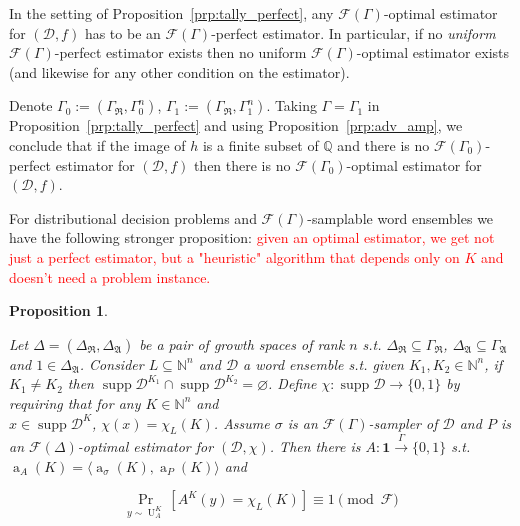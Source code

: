 \documentclass[11pt]{article}
\numberwithin{equation}{section}
\theoremstyle{definition}
\theoremstyle{plain}
\newtheorem{proposition}{Proposition}[section]
\newcommand{\Bool}{\{0,1\}}
\DeclareMathOperator{\Supp}{supp}
\DeclareMathOperator{\Prb}{Pr}
\DeclareMathOperator{\A}{a}
\DeclareMathOperator{\Un}{U}
\newcommand{\Nats}{\mathbb{N}}
\newcommand{\Rats}{\mathbb{Q}}
\newcommand{\Chev}[1]{\langle #1 \rangle}
\newcommand{\Dist}{\mathcal{D}}
\newcommand{\GrowR}{\Gamma_{\mathfrak{R}}}
\newcommand{\GrowA}{\Gamma_{\mathfrak{A}}}
\newcommand{\Fall}{\mathcal{F}}
\newcommand{\EG}{\Fall(\Gamma)}
\newcommand{\Scheme}{\xrightarrow{\Gamma}}
\begin{document}
In the setting of Proposition~\ref{prp:tally_perfect}, any ${\EG}$-optimal estimator for ${(\Dist,f)}$ has to be an ${\EG}$-perfect estimator. In particular, if no \emph{uniform} ${\EG}$-perfect estimator exists then no uniform ${\EG}$-optimal estimator exists (and likewise for any other condition on the estimator). 

Denote ${\Gamma_0:=(\GrowR,\Gamma_0^n)}$, ${\Gamma_1:=(\GrowR,\Gamma_1^n)}$. Taking ${\Gamma=\Gamma_1}$ in Proposition~\ref{prp:tally_perfect} and using Proposition~\ref{prp:adv_amp}, we conclude that if the image of ${h}$ is a finite subset of ${\Rats}$ and there is no ${\Fall(\Gamma_0)}$-perfect estimator for ${(\Dist,f)}$ then there is no ${\Fall(\Gamma_0)}$-optimal estimator for ${(\Dist,f)}$. 

For distributional decision problems and ${\EG}$-samplable word ensembles we have the following stronger proposition: \textcolor{red}{given an optimal estimator, we get not just a perfect estimator, but a "heuristic" algorithm that depends only on $K$ and doesn't need a problem instance.}

\begin{samepage}
\begin{proposition}
\label{prp:tally_smp_bpp}

Let ${\Delta=(\Delta_{\mathfrak{R}}, \Delta_{\mathfrak{A}})}$ be a pair of growth spaces of rank ${n}$ s.t. ${\Delta_{\mathfrak{R}} \subseteq \GrowR}$, ${\Delta_{\mathfrak{A}} \subseteq \GrowA}$ and ${1 \in \Delta_{\mathfrak{A}}}$. Consider ${L \subseteq \Nats^n}$ and ${\Dist}$ a word ensemble s.t. given ${K_1, K_2 \in \Nats^n}$, if ${K_1 \ne K_2}$ then ${\Supp \Dist^{K_1} \cap \Supp \Dist^{K_2} = \varnothing}$. Define ${\chi: \Supp \Dist \rightarrow \Bool}$ by requiring that for any ${K \in \Nats^n}$ and\\ $x \in \Supp \Dist^K$, ${\chi(x)=\chi_L(K)}$. Assume ${\sigma}$ is an ${\EG}$-sampler of ${\Dist}$ and ${P}$ is an ${\Fall(\Delta)}$-optimal estimator for ${(\Dist, \chi)}$. Then there is ${A: \bm{1} \Scheme \Bool}$ s.t. ${\A_A(K)=\Chev{\A_\sigma(K),\A_P(K)}}$ and

\begin{equation}
\Prb_{y \sim \Un_A^K}[A^K(y)=\chi_L(K)] \equiv 1 \pmod \Fall
\end{equation}

\end{proposition}
\end{samepage}
\end{document}
